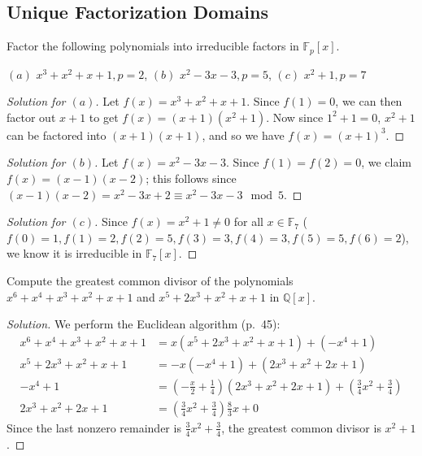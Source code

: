 \documentclass[12pt]{article}
\theoremstyle{remark}
\begin{document}
\subsection{Unique Factorization Domains}
\begin{problem}
  Factor the following polynomials into irreducible factors in $\mathbb{F}_p[x]$.
  \par\noindent $(a)$ $x^3+x^2+x+1, p = 2$, $(b)$ $x^2-3x-3, p = 5$, $(c)$ $x^2+1, p = 7$
\end{problem}
\begin{proof}[Solution for $(a)$]
  Let $f(x) = x^3+x^2+x+1$. Since $f(1) = 0$, we can then factor out $x+1$ to get $f(x) = (x+1)(x^2+1)$. Now since $1^2+1=0$, $x^2 + 1$ can be factored into $(x+1)(x+1)$, and so we have $f(x) = (x+1)^3$.
\end{proof}
\begin{proof}[Solution for $(b)$]
  Let $f(x) = x^2 - 3x -3$. Since $f(1) = f(2) = 0$, we claim $f(x) = (x-1)(x-2)$; this follows since $(x-1)(x-2) = x^2 - 3x + 2 \equiv x^2 - 3x - 3 \mod 5$.
\end{proof}
\begin{proof}[Solution for $(c)$]
  Since $f(x) = x^2 + 1 \ne 0$ for all $x \in \mathbb{F}_7$ ($f(0) = 1, f(1) = 2, f(2) = 5, f(3) = 3, f(4) = 3, f(5) = 5, f(6) = 2$), we know it is irreducible in $\mathbb{F}_7[x]$.
\end{proof}

\begin{problem}
  Compute the greatest common divisor of the polynomials $x^6 + x^4 + x^3 + x^2 + x + 1$ and $x^5 + 2x^3 + x^2 + x + 1$ in $\mathbb{Q}[x]$.
\end{problem}
\begin{proof}[Solution]
  We perform the Euclidean algorithm (p.~45):
  \begin{align*}
    x^6 + x^4 + x^3 + x^2 + x + 1 &= x(x^5 + 2x^3 + x^2 + x + 1) + (-x^4+1)\\
    x^5 + 2x^3 + x^2 + x + 1 &= -x(-x^4+1) + (2x^3 + x^2 + 2x + 1)\\
    -x^4 + 1 &= \left( -\frac{x}{2} + \frac{1}{4} \right) (2x^3 + x^2 + 2x + 1) + \left(\frac{3}{4}x^2 + \frac{3}{4}\right)\\
    2x^3 + x^2 + 2x + 1 &= \left(\frac{3}{4}x^2 + \frac{3}{4}\right)\frac{8}{3} x + 0
  \end{align*}
  Since the last nonzero remainder is $\frac{3}{4}x^2 + \frac{3}{4}$, the greatest common divisor is $x^2 + 1$.
\end{proof}
\end{document}
